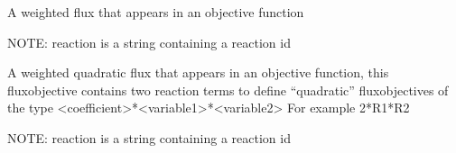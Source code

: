 \documentclass[letterpaper,10pt,english]{sphinxmanual}
\begin{document}
\begin{fulllineitems}
\label{\detokenize{modules_doc:cbmpy.CBModel.FluxObjective}}
\pysigstartsignatures
{}
\pysigstopsignatures
\sphinxAtStartPar
A weighted flux that appears in an objective function

\sphinxAtStartPar
NOTE: reaction is a string containing a reaction id

\end{fulllineitems}


\begin{fulllineitems}
\label{\detokenize{modules_doc:cbmpy.CBModel.FluxObjectiveQuadratic}}
\pysigstartsignatures
{}
\pysigstopsignatures
\sphinxAtStartPar
A weighted quadratic flux that appears in an objective function, this fluxobjective contains
two reaction terms to define “quadratic” fluxobjectives of the type \textless{}coefficient\textgreater{}*\textless{}variable1\textgreater{}*\textless{}variable2\textgreater{}
For example 2*R1*R2

\sphinxAtStartPar
NOTE: reaction is a string containing a reaction id

\end{fulllineitems}

\end{document}
